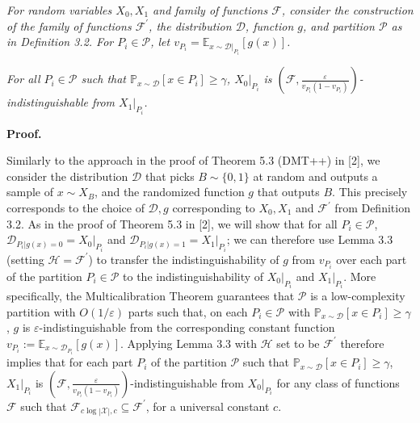 \emph{For random variables $X_{0},X_{1}$ and family of functions $\mathcal{F}$, consider the construction of the family of functions $\mathcal{F}^{\prime}$, the distribution $\mathcal{D}$, function $g$, and partition $\mathcal{P}$ as in Definition 3.2. For $P_{i}\in\mathcal{P}$, let $v_{P_{i}}=\mathbb{E}_{x\sim\mathcal{D}|_{P_{i}}}[g(x)]$.}\par




\emph{For all $P_{i}\in\mathcal{P}$ such that $\mathbb{P}_{x\sim\mathcal{D}}[x\in P_{i}]\geq\gamma$, $X_{0}|_{P_{i}}$ is $(\mathcal{F},\frac{\varepsilon}{v_{P_{i}}(1-v_{P_{i}})})$-indistinguishable from $X_{1}|_{P_{i}}$.}\par






\par\medskip\noindent\textbf{Proof.}\par




Similarly to the approach in the proof of Theorem 5.3 (DMT++) in [2], we consider the distribution $\mathcal{D}$ that picks $B\sim\{0,1\}$ at random and outputs a sample of $x\sim X_{B}$, and the randomized function $g$ that outputs $B$. This precisely corresponds to the choice of $\mathcal{D},g$ corresponding to $X_{0},X_{1}$ and $\mathcal{F}^{\prime}$ from Definition 3.2. As in the proof of Theorem 5.3 in [2], we will show that for all $P_{i}\in\mathcal{P}$, $\mathcal{D}_{P_{i}|g(x)=0}=X_{0}|_{P_{i}}$ and $\mathcal{D}_{P_{i}|g(x)=1}=X_{1}|_{P_{i}}$; we can therefore use Lemma 3.3 (setting $\mathcal{H}=\mathcal{F}^{\prime}$) to transfer the indistinguishability of $g$ from $v_{P_{i}}$ over each part of the partition $P_{i}\in\mathcal{P}$ to the indistinguishability of $X_{0}|_{P_{i}}$ and $X_{1}|_{P_{i}}$. More specifically, the Multicalibration Theorem guarantees that $\mathcal{P}$ is a low-complexity partition with $O(1/\varepsilon)$ parts such that, on each $P_{i}\in\mathcal{P}$ with $\mathbb{P}_{x\sim\mathcal{D}}[x\in P_{i}]\geq\gamma$, $g$ is $\varepsilon$-indistinguishable from the corresponding constant function $v_{P_{i}}:=\mathbb{E}_{x\sim\mathcal{D}_{P_{i}}}[g(x)]$. Applying Lemma 3.3 with $\mathcal{H}$ set to be $\mathcal{F}^{\prime}$ therefore implies that for each part $P_{i}$ of the partition $\mathcal{P}$ such that $\mathbb{P}_{x\sim\mathcal{D}}[x\in P_{i}]\geq\gamma$, $X_{1}|_{P_{i}}$ is $(\mathcal{F},\frac{\varepsilon}{v_{P_{i}}(1-v_{P_{i}})})$-indistinguishable from $X_{0}|_{P_{i}}$ for any class of functions $\mathcal{F}$ such that $\mathcal{F}_{c\log|\mathcal{X}|,c}\subseteq\mathcal{F}^{\prime}$, for a universal constant $c$.\par




